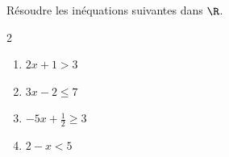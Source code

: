 \begin{exo}{}
	Résoudre les inéquations suivantes dans $\R$.
	\vspace*{-2mm}\begin{multicols}{2}
	\begin{enumerate}[itemsep=2mm]
		\item $2x + 1 > 3$
		\item $3x - 2 \le 7$
		\item $-5x + \frac{1}{2} \ge 3$
		\item $2 - x < 5$
	\end{enumerate}
	\end{multicols}\vspace*{-2mm}
\end{exo}
